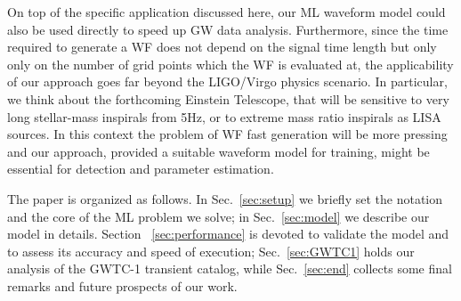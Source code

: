 \documentclass[twocolumn,showpacs,preprintnumbers,nofootinbib,prd,
superscriptaddress,10pt]{revtex4-1}
\begin{document}
%
On top of the specific application discussed here, our ML waveform model could also be used directly 
to speed up GW data analysis.
Furthermore, since the time required to generate a WF does not depend
on the signal time length but only only on the number of grid points which the WF is evaluated at,
the applicability of our approach goes far beyond the LIGO/Virgo physics scenario. In particular,
we think about the forthcoming Einstein Telescope, that will be sensitive to very long stellar-mass 
inspirals from 5Hz, or to extreme mass ratio inspirals as LISA sources. In this context the problem
of WF fast generation will be more pressing and our approach, provided a suitable waveform model 
for training,  might be essential for detection and parameter estimation. 

The paper is organized as follows. In Sec.~\ref{sec:setup} we briefly set the 
notation and the core of the ML problem we solve; in Sec.~\ref{sec:model} we describe 
our model in details. Section ~\ref{sec:performance} is devoted to validate the model 
and to assess its accuracy and speed of execution; Sec.~\ref{sec:GWTC1} holds 
our analysis of the GWTC-1 transient catalog, while  Sec.~\ref{sec:end} collects 
some final remarks and future prospects of our work.

\end{document}

